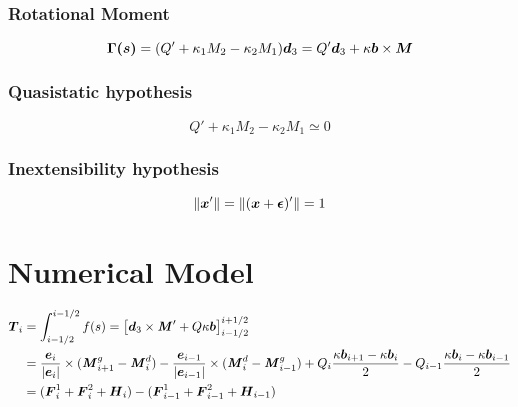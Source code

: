 \subsubsection{Rotational Moment}
\begin{equation}
	\boldsymbol{\Gamma(s)} = (Q' + \kappa_1 M_2 - \kappa_2 M_1)\boldsymbol{d}_3
	= Q' \boldsymbol{d}_3 + \kappa\boldsymbol{b} \times \boldsymbol{M}
\end{equation}
\subsubsection{Quasistatic hypothesis}
\begin{equation}
	Q' + \kappa_1 M_2 - \kappa_2 M_1 \simeq 0
\end{equation}
\subsubsection{Inextensibility hypothesis}
\begin{equation}
	\|\boldsymbol{x}'\| = \|(\boldsymbol{x} + \boldsymbol{\epsilon})'\| = 1
\end{equation}

\section{Numerical Model}

\begin{equation}
	\begin{aligned}
	\boldsymbol{T}_i 
	&= \int_{i-1/2}^{i-1/2} f(s)  = \left[
	\boldsymbol{d}_3 \times \boldsymbol{\mathit{M}}'
	+ Q\kappa\boldsymbol{b}
	\right]_{i-1/2}^{i+1/2} \\
	&= 	\frac{\boldsymbol{e}_i}{|\boldsymbol{e}_i|} \times (\boldsymbol{\mathit{M}}^g_{i+1} - \boldsymbol{\mathit{M}}^d_{i})
		- \frac{\boldsymbol{e}_{i-1}}{|\boldsymbol{e}_{i-1}|} \times (\boldsymbol{\mathit{M}}^d_{i} - \boldsymbol{\mathit{M}}^g_{i-1}) 
		+ Q_i\frac{\kappa\boldsymbol{b}_{i+1}-\kappa\boldsymbol{b}_i}{2}
		- Q_{i-1}\frac{\kappa\boldsymbol{b}_{i}-\kappa\boldsymbol{b}_{i-1}}{2}\\
	&= (\boldsymbol{F}^1_{i} + \boldsymbol{F}^2_{i} + \boldsymbol{H}_{i}) - (\boldsymbol{F}^1_{i-1} + \boldsymbol{F}^2_{i-1} +  \boldsymbol{H}_{i-1})
	\end{aligned}
\end{equation}

